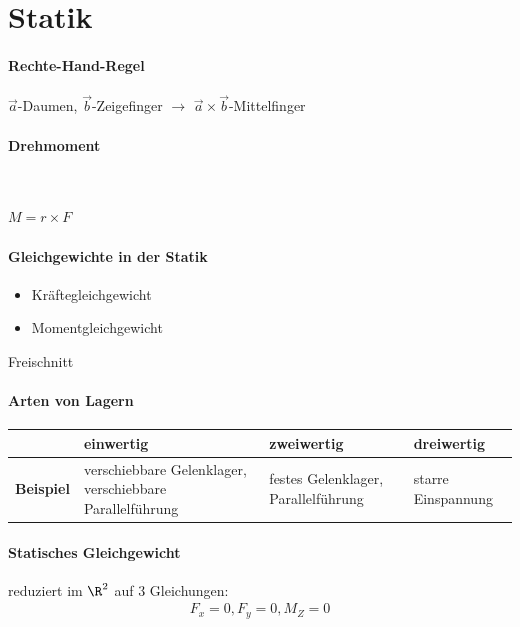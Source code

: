 
\section{Statik}
\paragraph{Rechte-Hand-Regel}
$\vec{a}$-Daumen, $\vec{b}$-Zeigefinger $\to$ $\vec{a}\times\vec{b}$-Mittelfinger
\paragraph{Drehmoment}\
\begin{definition}
	$M=r\times F$
\end{definition}
\paragraph{Gleichgewichte in der Statik}
\begin{itemize}
	\item Kräftegleichgewicht
	\item Momentgleichgewicht
\end{itemize}
Freischnitt
\paragraph{Arten von Lagern}
\begin{center}
	\setlength{\extrarowheight}{4pt} 
	\begin{tabularx}{0.8\textwidth}{>{\bfseries\arraybackslash}l|X|X|X}
		{\large Lagerwertigkeit}&einwertig&zweiwertig&dreiwertig\\
		\hline
		Beispiel&verschiebbare Gelenklager, verschiebbare Parallelführung& festes Gelenklager, Parallelführung& starre Einspannung
\end{tabularx}
\end{center}
\paragraph{Statisches Gleichgewicht}
reduziert im $\R^2$ auf 3 Gleichungen:
\begin{align*}
	F_x=0, F_y=0, M_Z=0
\end{align*}
